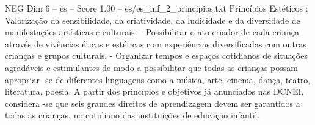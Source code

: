 \begin{textsample}{NEG Dim 6 – es – Score 1.00 – es/es\_inf\_2\_principios.txt}
Princípios Estéticos : Valorização da sensibilidade, da criatividade, da ludicidade e da diversidade de manifestações artísticas e culturais. - Possibilitar o ato criador de cada criança através de vivências éticas e estéticas com experiências diversificadas com outras crianças e grupos culturais. - Organizar tempos e espaços cotidianos de situações agradáveis e estimulantes de modo a possibilitar que todas as crianças possam apropriar -se de diferentes linguagens como a música, arte, cinema, dança, teatro, literatura, poesia.
A partir dos princípios e objetivos já anunciados nas DCNEI, considera -se que seis grandes direitos de aprendizagem devem ser garantidos a todas as crianças, no cotidiano das instituições de educação infantil.

\end{textsample}
